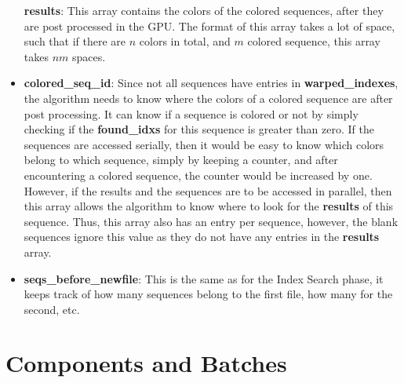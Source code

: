 \begin{itemize}
  \itm \textbf{results}: This array contains the colors of the colored sequences, after they are post processed in the GPU. The format of this array takes a lot of space, such that if there are $n$ colors in total, and $m$ colored sequence, this array takes $nm$ spaces.
  \item \textbf{colored\_seq\_id}: Since not all sequences have entries in \textbf{warped\_indexes}, the algorithm needs to know where the colors of a colored sequence are after post processing. It can know if a sequence is colored or not by simply checking if the \textbf{found\_idxs} for this sequence is greater than zero. If the sequences are accessed serially, then it would be easy to know which colors belong to which sequence, simply by keeping a counter, and after encountering a colored sequence, the counter would be increased by one. However, if the results and the sequences are to be accessed in parallel, then this array allows the algorithm to know where to look for the \textbf{results} of this sequence. Thus, this array also has an entry per sequence, however, the blank sequences ignore this value as they do not have any entries in the \textbf{results} array.
  \item \textbf{seqs\_before\_newfile}: This is the same as for the Index Search phase, it keeps track of how many sequences belong to the first file, how many for the second, etc.
\end{itemize}

\section{Components and Batches}\label{app:Batches}

